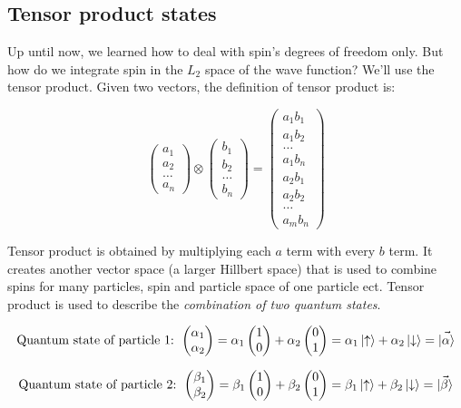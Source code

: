	\subsection{Tensor product states}
	Up until now, we learned how to deal with spin's degrees of freedom only.
But how do we integrate spin in the $L_2$ space of the wave function? We'll use the tensor product.
Given two vectors, the definition of tensor product is:

	$$\begin{pmatrix}a_1\\a_2\\\dots\\a_n\end{pmatrix}\otimes\begin{pmatrix}b_1\\b_2\\\dots\\b_n\end{pmatrix}=\begin{pmatrix}a_1b_1\\a_1b_2\\\dots\\a_1b_n\\a_2b_1\\a_2b_2\\\dots\\a_mb_n\end{pmatrix}$$

	Tensor product is obtained by multiplying each $a$ term with every $b$ term.
It creates another vector space (a larger Hillbert space) that is used to combine spins for many particles, spin and particle space of one particle ect.
	Tensor product is used to describe the \emph{combination of two quantum states}.

	$$\text{Quantum state of particle 1: } \begin{pmatrix}\alpha_1\\\alpha_2\end{pmatrix}=\alpha_1\begin{pmatrix}1\\0\end{pmatrix}+\alpha_2\begin{pmatrix}0\\1\end{pmatrix}=\alpha_1\ket{\uparrow}+\alpha_2\ket{\downarrow}=\vec{\ket\alpha}$$

	$$\text{Quantum state of particle 2: } \begin{pmatrix}\beta_1\\\beta_2\end{pmatrix}=\beta_1\begin{pmatrix}1\\0\end{pmatrix}+\beta_2\begin{pmatrix}0\\1\end{pmatrix}=\beta_1\ket{\uparrow}+\beta_2\ket{\downarrow}=\vec{\ket{\beta}}$$

